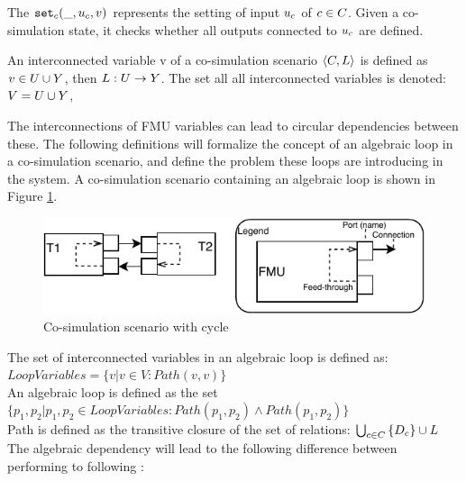 \documentclass[runningheads]{llncs}
\begin{document}
\begin{definition}\label{def:setin}
The $\mathtt{set}_{c}(\_, u_{c}, v)$ represents the setting of input $u_{c}$  of $c \in C$. Given a co-simulation state, it checks whether all outputs connected to $u_{c}$ are defined.
\end{definition}

\begin{definition}
An interconnected variable v of a co-simulation scenario $ \left\langle C, L \right\rangle $ is defined as $v \in U \cup Y$, then $L : U \to Y$.
The set all all interconnected variables is denoted: $V = U \cup Y$,
\end{definition}

The interconnections of FMU variables can lead to circular dependencies between these. The following definitions will formalize the concept of an algebraic loop in a co-simulation scenario, and define the problem these loops are introducing in the system. A co-simulation scenario containing an algebraic loop is shown in Figure \ref{fig:fmu_cycle}.

\begin{figure}
    \centering
    \includegraphics{images/fmu_cycle.pdf}
    \caption{Co-simulation scenario with cycle}
    \label{fig:fmu_cycle}
\end{figure}

\begin{definition} 
The set of interconnected variables in an algebraic loop is defined as: $LoopVariables = \{v | v \in V : Path(v,v)\}$ \\
An algebraic loop is defined as the set $\{p_1, p_2 | p_1, p_2 \in LoopVariables: Path(p_1, p_2) \land Path(p_1, p_2)\}$\\
Path is defined as the transitive closure of the set of relations: $\bigcup_{c \in C}  \left\{ D_{c} \right\} \cup L$\\
The algebraic dependency will lead to the following difference between performing to following :
\end{definition}
\end{document}

